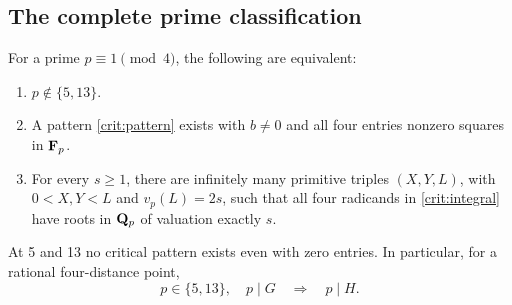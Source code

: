 \subsection{The complete prime classification}

\begin{theorem}\label{thm:crit-basic}
For a prime \(p\equiv1\pmod4\), the following are equivalent:
\begin{enumerate}
\item \(p\notin\{5,13\}\).
\item A pattern \eqref{crit:pattern} exists with \(b\ne0\) and all
      four entries nonzero squares in \(\mathbf F_p\).
\item For every \(s\ge1\), there are infinitely many primitive
      triples \((X,Y,L)\), with \(0<X,Y<L\) and \(v_p(L)=2s\),
      such that all four radicands in \eqref{crit:integral} have
      roots in \(\mathbf Q_p\) of valuation exactly \(s\).
\end{enumerate}
At 5 and 13 no critical pattern exists even with zero entries.
In particular, for a rational four-distance point,
\[
 p\in\{5,13\},\quad p\mid G\quad\Longrightarrow\quad p\mid H.
\]
\end{theorem}

